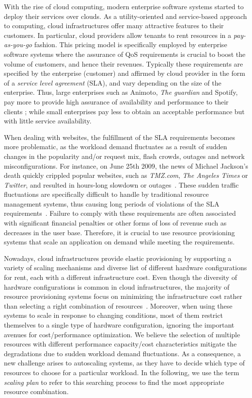 With the rise of cloud computing, modern enterprise software systems
started to deploy their services over clouds. As a utility-oriented
and service-based approach to computing, cloud infrastructures offer
many attractive features to their customers.  In particular, cloud
providers allow tenants to rent resources in a \emph{pay-as-you-go}
fashion. This pricing model is specifically employed by enterprise
software systems where the assurance of QoS requirements is crucial to
boost the volume of customers, and hence their revenues. Typically
these requirements are specified by the enterprise (customer) and
affirmed by cloud provider in the form of a \emph{service level
agreement} (SLA), and vary depending on the size of the
enterprise. Thus, large enterprises such as Animoto, \emph{The
guardian} and Spotify, pay more to provide high assurance of
availability and performance to their clients \cite{casestudiescloud};
while small enterprises pay less to obtain an acceptable performance
but with little service availability.


When dealing with websites, the fulfillment of the SLA requirements
becomes more problematic, as the workload demand fluctuates as a
result of sudden changes in the popularity and/or request mix, flash
crowds, outages and network misconfigurations.  For instance, on June
25th 2009, the news of Michael Jackson's death quickly crippled
popular websites, such as \emph{TMZ.com}, \emph{The Angeles Times}
or \emph{Twitter}, and resulted in hours-long slowdown or
outages~\cite{outagesTimes}. These sudden traffic fluctuations are
specifically difficult to handle by traditional resource management
systems, thus causing long periods of violations of the SLA
requirements~\cite{trafficCongestion}. Failure to comply with these
requirements are often associated with significant financial penalties
or other forms of loss of revenue such as decreases in the user base.
Therefore, it is crucial to use resource provisioning systems that
scale an application on demand while meeting the requirements.

Nowadays, cloud infrastructures provide elastic provisioning by
supporting a variety of scaling mechanisms and diverse list of
different hardware configurations for rent, each with a different
infrastructure cost. Even though the diversity of hardware
configurations is common in cloud infrastructures, the majority of
resource provisioning systems focus on minimizing the infrastructure
cost rather than selecting a right combination of
resources~\cite{herbst_2013,urgaonkar_agile_2008,dejavu2012}. Moreover,
when using these systems to scale in response to changing conditions,
most of them restrict themselves to a single type of hardware
configuration, ignoring the important avenues for cost/performance
optimization. We believe the selection of multiple resources with
different performance capacity/cost characteristics mitigate the
degradations due to sudden workload demand fluctuations. As a
consequence, a new challenge arises to autoscaling systems, as they
have to decide which type of resources to choose for a particular
workload. In the following, we use the term \emph{scaling plan} to
refer to this searching process to find the most appropriate resource
combination.

